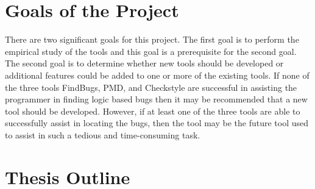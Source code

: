 \section{Goals of the Project}\label{sec:goals}
There are two significant goals for this project. The first goal is to perform the empirical study of the tools and this goal is a prerequisite for the second goal. The second goal is to determine whether new tools should be developed or additional features could be added to one or more of the existing tools. If none of the three tools FindBugs, PMD, and Checkstyle are successful in assisting the programmer in finding logic based bugs then it may be recommended that a new tool should be developed. However, if at least one of the three tools are able to successfully assist in locating the bugs, then the tool may be the future tool used to assist in such a tedious and time-consuming task. 
 


\section{Thesis Outline}\label{sec:outline}

